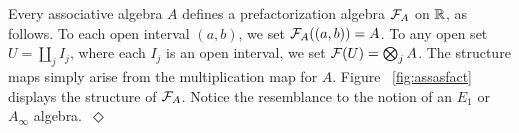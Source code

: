 \documentclass[11pt]{amsart}
\begin{document}
\begin{eg}\label{ex:associativealgebra}
Every associative algebra $A$ defines a prefactorization algebra $\mathcal F_A$ on $\mathbb R$, as follows. 
To each open interval $(a,b)$, we set $\mathcal F_A( (a,b) ) = A$. 
To any open set $U = \coprod_j I_j$, 
where each $I_j$ is an open interval, we set $\mathcal F(U) = \bigotimes_j A$. 
The structure maps simply arise from the multiplication map for $A$. 
Figure ~\ref{fig:assasfact} displays the structure of $\mathcal F_A$. 
Notice the resemblance to the notion of an $E_1$ or $A_\infty$ algebra.~\hfill$\Diamond$
\end{eg}

\end{document}
